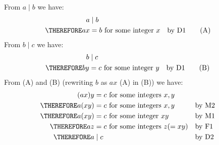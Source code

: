 From $a \mid b$ we have:
\begin{align*}
a &\mid b  \\
\THEREFORE ax &= b \text{ for some integer $x$} & & \text{by D1} \tag{A}
\end{align*}
From $b \mid c$ we have:
\begin{align*}
b &\mid c  \\
\THEREFORE by &= c \text{ for some integer $y$} & & \text{by D1} \tag{B}
\end{align*}
From (A) and (B) (rewriting $b$ as $ax$ (A) in (B)) we have:
\begin{align*}
           (ax)y &= c \text{ for some integers $x, y$}                     \\
\THEREFORE a(xy) &= c \text{ for some integers $x, y$}     & & \text{by M2} \\
\THEREFORE a(xy) &= c \text{ for some integer  $xy$}       & & \text{by M1} \\
\THEREFORE az    &= c \text{ for some integers $z (= xy)$} & & \text{by F1} \\
\THEREFORE a &\mid c                                       & & \text{by D2} 
\end{align*}

